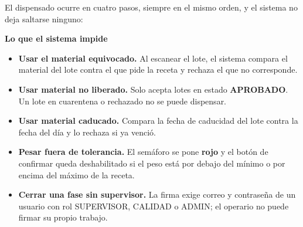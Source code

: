 \documentclass[11pt,letterpaper]{article}
\begin{document}
\vspace{14pt}


\noindent El dispensado ocurre en cuatro pasos, siempre en el mismo orden, y el sistema no deja saltarse ninguno:

\vspace{10pt}

\begin{cajaInfo}
\begin{center}
\end{center}
\end{cajaInfo}

\vspace{12pt}

\noindent\textbf{\color{azulcom}Lo que el sistema impide}
\begin{itemize}[leftmargin=16pt, itemsep=4pt, topsep=4pt]
    \item \textbf{Usar el material equivocado.} Al escanear el lote, el sistema compara el material del lote contra el que pide la receta y rechaza el que no corresponde.
    \item \textbf{Usar material no liberado.} Solo acepta lotes en estado \textbf{APROBADO}. Un lote en cuarentena o rechazado no se puede dispensar.
    \item \textbf{Usar material caducado.} Compara la fecha de caducidad del lote contra la fecha del día y lo rechaza si ya venció.
    \item \textbf{Pesar fuera de tolerancia.} El semáforo se pone \textbf{rojo} y el botón de confirmar queda deshabilitado si el peso está por debajo del mínimo o por encima del máximo de la receta.
    \item \textbf{Cerrar una fase sin supervisor.} La firma exige correo y contraseña de un usuario con rol SUPERVISOR, CALIDAD o ADMIN; el operario no puede firmar su propio trabajo.
\end{itemize}
\end{document}
